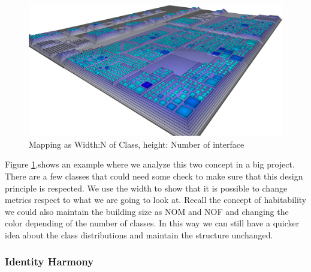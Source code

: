 \documentclass[]{usiinfbachelorproject}
\begin{document}
\begin{figure}
\centering
\includegraphics[width=.60\textwidth]{images/ClassesAndInterfaces}
\caption[Classes and Interfaces Mapping]{Mapping as Width:N of Class, height: Number of interface \label{fig:classInterface}
}
	
\end{figure}
Figure \ref{fig:classInterface},shows an example where we analyze this two concept in a big project. There are a few classes that could need some check to make sure that this design principle is respected. We use the width to show that it is possible to change metrics respect to what we are going to look at. Recall the concept of habitability \cite{programComp} we could also maintain the building size as NOM and NOF and changing the color depending of the number of classes. In this way we can still have a quicker idea about the class distributions and maintain the structure unchanged. 


\subsubsection{Identity Harmony	}\label{sec:idHarmony}
\end{document}
